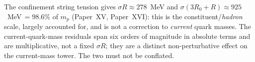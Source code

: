 \begin{remark}
\label{P20:rem:two_objects}
The confinement string tension gives $\sigma R\approx278$~MeV and
$\sigma(3R_0+R)\approx925$~MeV$\,=98.6\%$ of $m_p$ (Paper~XV,
Paper~XVI): this is the constituent/\emph{hadron} scale, largely
accounted for, and is not a correction to \emph{current} quark masses.
The current-quark-mass residuals span six orders of magnitude in
absolute terms and are multiplicative, not a fixed $\sigma R$; they are
a distinct non-perturbative effect on the current-mass tower. The two
must not be conflated.
\end{remark}
